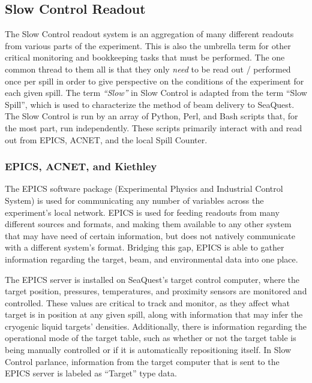 \subsection{Slow Control Readout}

The Slow Control readout system is an aggregation of many different readouts from various parts of the experiment. This is also the umbrella term for other critical monitoring and bookkeeping tasks that must be performed. The one common thread to them all is that they only \emph{need} to be read out / performed once per spill in order to give perspective on the conditions of the experiment for each given spill. The term \emph{``Slow''} in Slow Control is adapted from the term ``Slow Spill'', which is used to characterize the method of beam delivery to SeaQuest. The Slow Control is run by an array of Python, Perl, and Bash scripts that, for the most part, run independently. These scripts primarily interact with and read out from EPICS, ACNET, and the local Spill Counter.

\subsubsection{EPICS, ACNET, and Kiethley}

The EPICS software package (Experimental Physics and Industrial Control System) is used for communicating any number of variables across the experiment's local network. EPICS is used for feeding readouts from many different sources and formats, and making them available to any other system that may have need of certain information, but does not natively communicate with a different system's format. Bridging this gap, EPICS is able to gather information regarding the target, beam, and environmental data into one place.

The EPICS server is installed on SeaQuest's target control computer, where the target position, pressures, temperatures, and proximity sensors are monitored and controlled. These values are critical to track and monitor, as they affect what target is in position at any given spill, along with information that may infer the cryogenic liquid targets' densities. Additionally, there is information regarding the operational mode of the target table, such as whether or not the target table is being manually controlled or if it is automatically repositioning itself. In Slow Control parlance, information from the target computer that is sent to the EPICS server is labeled as ``Target'' type data.

